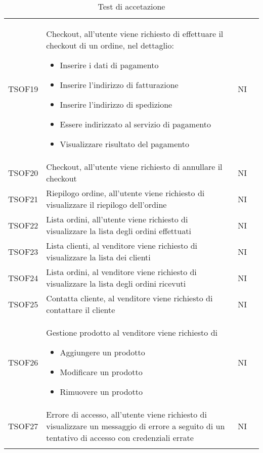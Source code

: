 \begin{center}
\begin{longtable}[!h]{p{50px} p{245px} p{75px} p{50px}}
        TSOF19  & Checkout, all'utente viene richiesto di effettuare il checkout di un ordine, nel dettaglio: \begin{itemize} \item Inserire i dati di pagamento \item Inserire l'indirizzo di fatturazione \item Inserire l'indirizzo di spedizione \item Essere indirizzato al servizio di pagamento \item Visualizzare risultato del pagamento \end{itemize} & NI \\
        TSOF20  & Checkout, all'utente viene richiesto di annullare il checkout & NI \\
        TSOF21  & Riepilogo ordine, all'utente viene richiesto di visualizzare il riepilogo dell'ordine & NI \\
        TSOF22  & Lista ordini, all'utente viene richiesto di visualizzare la lista degli ordini effettuati  & NI \\
        TSOF23  & Lista clienti, al venditore viene richiesto di visualizzare la lista dei clienti & NI \\
        TSOF24  & Lista ordini, al venditore viene richiesto di visualizzare la lista degli ordini ricevuti & NI \\
        TSOF25  & Contatta cliente, al venditore viene richiesto di contattare il cliente & NI \\
        TSOF26  & Gestione prodotto al venditore viene richiesto di \begin{itemize} \item Aggiungere un prodotto \item Modificare un prodotto \item Rimuovere un prodotto \end{itemize} & NI \\
        TSOF27  & Errore di accesso, all'utente viene richiesto di visualizzare un messaggio di errore a seguito di un tentativo di accesso con credenziali errate & NI \\
        \rowcolor{white}\caption{Test di accetazione}            
    \end{longtable}    
\end{center}